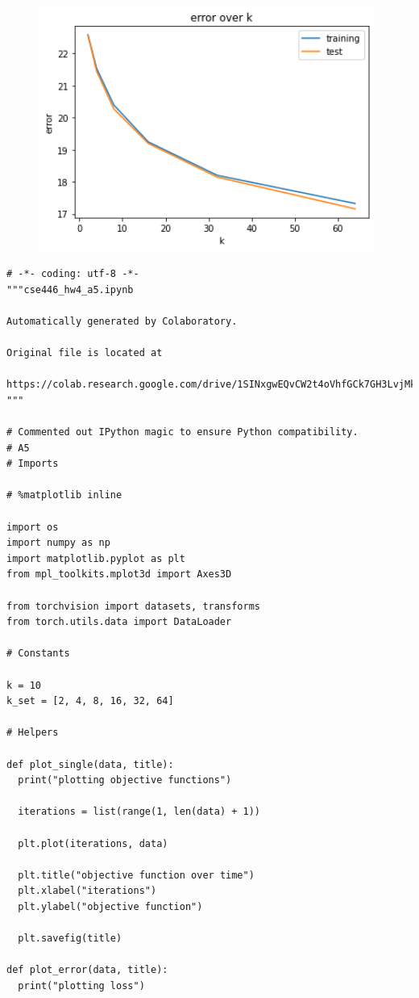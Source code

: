 \documentclass{article}
\newcommand{\1}{\mathbf{1}}
\begin{document}
{\begin{figure}[!hb]
  \centering
  \includegraphics[width=110mm]{../hw4-code/results/a5_c.png}
\end{figure}

\newpage

\begin{verbatim}
# -*- coding: utf-8 -*-
"""cse446_hw4_a5.ipynb

Automatically generated by Colaboratory.

Original file is located at
    https://colab.research.google.com/drive/1SINxgwEQvCW2t4oVhfGCk7GH3LvjMkmZ
"""

# Commented out IPython magic to ensure Python compatibility.
# A5
# Imports

# %matplotlib inline

import os
import numpy as np
import matplotlib.pyplot as plt
from mpl_toolkits.mplot3d import Axes3D

from torchvision import datasets, transforms
from torch.utils.data import DataLoader

# Constants 

k = 10
k_set = [2, 4, 8, 16, 32, 64]

# Helpers

def plot_single(data, title):
  print("plotting objective functions")

  iterations = list(range(1, len(data) + 1))

  plt.plot(iterations, data)

  plt.title("objective function over time")
  plt.xlabel("iterations")
  plt.ylabel("objective function")

  plt.savefig(title)

def plot_error(data, title):
  print("plotting loss")


\end{verbatim}}
\end{document}
